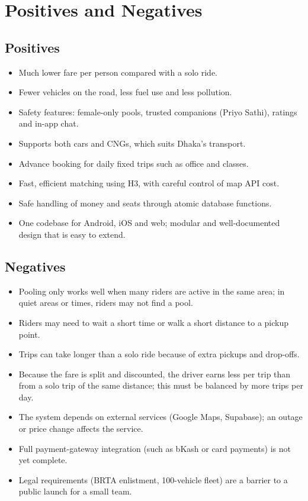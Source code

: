 \section{Positives and Negatives}
\label{sec:pos-neg}

\subsection{Positives}

\begin{itemize}
  \item Much lower fare per person compared with a solo ride.
  \item Fewer vehicles on the road, less fuel use and less pollution.
  \item Safety features: female-only pools, trusted companions (Priyo Sathi),
        ratings and in-app chat.
  \item Supports both cars and CNGs, which suits Dhaka's transport.
  \item Advance booking for daily fixed trips such as office and classes.
  \item Fast, efficient matching using H3, with careful control of map API
        cost.
  \item Safe handling of money and seats through atomic database functions.
  \item One codebase for Android, iOS and web; modular and well-documented
        design that is easy to extend.
\end{itemize}

\subsection{Negatives}

\begin{itemize}
  \item Pooling only works well when many riders are active in the same area;
        in quiet areas or times, riders may not find a pool.
  \item Riders may need to wait a short time or walk a short distance to a
        pickup point.
  \item Trips can take longer than a solo ride because of extra pickups and
        drop-offs.
  \item Because the fare is split and discounted, the driver earns less per
        trip than from a solo trip of the same distance; this must be balanced
        by more trips per day.
  \item The system depends on external services (Google Maps, Supabase); an
        outage or price change affects the service.
  \item Full payment-gateway integration (such as bKash or card payments) is
        not yet complete.
  \item Legal requirements (BRTA enlistment, 100-vehicle fleet) are a barrier
        to a public launch for a small team.
\end{itemize}

